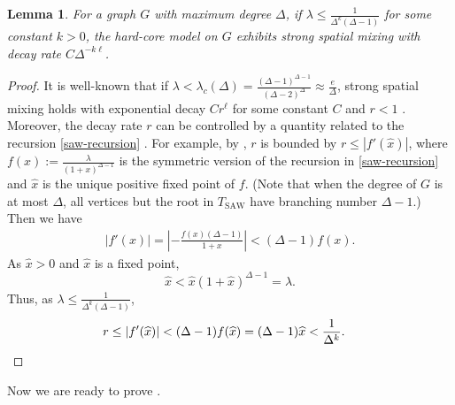 \documentclass[10pt,a4paper]{article}
\newtheorem{lemma}{Lemma}[section]
\newcommand{\abs}[1]{\ensuremath{\left\vert#1\right\vert}}
\newcommand{\eps}{\varepsilon}
\newcommand{\defeq}{:=}
\newcommand{\TSAW}{T_{\mathrm{SAW}}}
\begin{document}
\begin{lemma}
\label{lem:contraction}
  For a graph $G$ with maximum degree $\Delta$, if $\lambda\leq\frac{1}{\Delta^k(\Delta-1)}$ for some constant $k>0$, the hard-core model on $G$ exhibits strong spatial mixing with decay rate $C\Delta^{-k\ell}$. 
\end{lemma}

\begin{proof}
  It is well-known that if $\lambda<\lambda_c(\Delta) = \frac{(\Delta-1)^{\Delta-1}}{(\Delta-2)^{\Delta}}\approx\frac{e}{\Delta}$,
  strong spatial mixing holds with exponential decay $Cr^{\ell}$ for some constant $C$ and $r<1$ \cite{Wei06}.
  Moreover, the decay rate $r$ can be controlled by a quantity related to the recursion \eqref{saw-recursion} \cite{SST14}.
  For example, by \cite[Lemma 7.20]{Guo15}, $r$ is bounded by $r\le|f'(\widehat{x})|$,
  where $f(x)\defeq\frac{\lambda}{(1+x)^{\Delta-1}}$ is the symmetric version of the recursion in \eqref{saw-recursion} and $\widehat{x}$ is the unique positive fixed point of $f$.
  (Note that when the degree of $G$ is at most $\Delta$, all vertices but the root in $\TSAW$ have branching number $\Delta-1$.)
  Then we have
  \begin{align*}
    \abs{f'(x)} = \abs{-\frac{f(x)(\Delta-1)}{1+x}} < (\Delta-1) f(x).
  \end{align*}
  As $\widehat{x}>0$ and $\widehat{x}$ is a fixed point,
  \[\widehat{x}<\widehat{x}(1+\widehat{x})^{\Delta-1}=\lambda.\]
  Thus, as $\lambda\leq\frac{1}{\Delta^k(\Delta-1)}$,
  \begin{align*}
    r&\le|f'(\widehat{x})|< (\Delta-1) f(\widehat{x})=(\Delta-1)\widehat{x}<\frac{1}{\Delta^k}. \qedhere
  \end{align*}
\end{proof}

Now we are ready to prove .

\def\epsnot{\eps_0}
\end{document}
